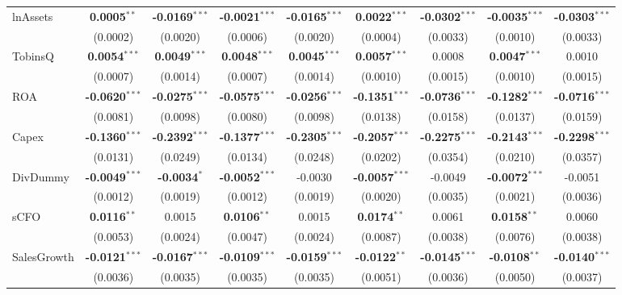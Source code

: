 \begin{landscape}
\begin{table}[H]
\begin{tabular}{lcccccccc}
lnAssets & \textbf{0.0005}$^{**}$ & \textbf{-0.0169}$^{***}$ & \textbf{-0.0021}$^{***}$ & \textbf{-0.0165}$^{***}$ & \textbf{0.0022}$^{***}$ & \textbf{-0.0302}$^{***}$ & \textbf{-0.0035}$^{***}$ & \textbf{-0.0303}$^{***}$ \\
 & (0.0002) & (0.0020) & (0.0006) & (0.0020) & (0.0004) & (0.0033) & (0.0010) & (0.0033) \\
TobinsQ & \textbf{0.0054}$^{***}$ & \textbf{0.0049}$^{***}$ & \textbf{0.0048}$^{***}$ & \textbf{0.0045}$^{***}$ & \textbf{0.0057}$^{***}$ & 0.0008 & \textbf{0.0047}$^{***}$ & 0.0010 \\
 & (0.0007) & (0.0014) & (0.0007) & (0.0014) & (0.0010) & (0.0015) & (0.0010) & (0.0015) \\
ROA & \textbf{-0.0620}$^{***}$ & \textbf{-0.0275}$^{***}$ & \textbf{-0.0575}$^{***}$ & \textbf{-0.0256}$^{***}$ & \textbf{-0.1351}$^{***}$ & \textbf{-0.0736}$^{***}$ & \textbf{-0.1282}$^{***}$ & \textbf{-0.0716}$^{***}$ \\
 & (0.0081) & (0.0098) & (0.0080) & (0.0098) & (0.0138) & (0.0158) & (0.0137) & (0.0159) \\
Capex & \textbf{-0.1360}$^{***}$ & \textbf{-0.2392}$^{***}$ & \textbf{-0.1377}$^{***}$ & \textbf{-0.2305}$^{***}$ & \textbf{-0.2057}$^{***}$ & \textbf{-0.2275}$^{***}$ & \textbf{-0.2143}$^{***}$ & \textbf{-0.2298}$^{***}$ \\
 & (0.0131) & (0.0249) & (0.0134) & (0.0248) & (0.0202) & (0.0354) & (0.0210) & (0.0357) \\
DivDummy & \textbf{-0.0049}$^{***}$ & \textbf{-0.0034}$^{*}$ & \textbf{-0.0052}$^{***}$ & -0.0030 & \textbf{-0.0057}$^{***}$ & -0.0049 & \textbf{-0.0072}$^{***}$ & -0.0051 \\
 & (0.0012) & (0.0019) & (0.0012) & (0.0019) & (0.0020) & (0.0035) & (0.0021) & (0.0036) \\
sCFO & \textbf{0.0116}$^{**}$ & 0.0015 & \textbf{0.0106}$^{**}$ & 0.0015 & \textbf{0.0174}$^{**}$ & 0.0061 & \textbf{0.0158}$^{**}$ & 0.0060 \\
 & (0.0053) & (0.0024) & (0.0047) & (0.0024) & (0.0087) & (0.0038) & (0.0076) & (0.0038) \\
SalesGrowth & \textbf{-0.0121}$^{***}$ & \textbf{-0.0167}$^{***}$ & \textbf{-0.0109}$^{***}$ & \textbf{-0.0159}$^{***}$ & \textbf{-0.0122}$^{**}$ & \textbf{-0.0145}$^{***}$ & \textbf{-0.0108}$^{**}$ & \textbf{-0.0140}$^{***}$ \\
 & (0.0036) & (0.0035) & (0.0035) & (0.0035) & (0.0051) & (0.0036) & (0.0050) & (0.0037) \\

\end{tabular}
\end{table}
\end{landscape}
